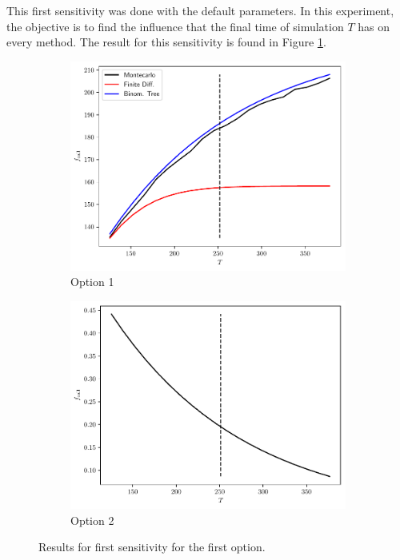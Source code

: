 \documentclass[11pt]{article}
\theoremstyle{definition}
\theoremstyle{remark}
\theoremstyle{remark}
\begin{document}
This first sensitivity was done with the default parameters. In this experiment,
the objective is to find the influence that the final time of simulation $T$ has
on every method. The result for this sensitivity is found in Figure
\ref{fig:fs1}.
\begin{figure}
  \centering
  \begin{subfigure}[b]{0.45\textwidth}
    \centering
    \includegraphics[scale=.5]{../plts/first_sens_opt1}
    \caption{Option 1}
  \end{subfigure}
  \begin{subfigure}[b]{0.45\textwidth}
    \centering
    \includegraphics[scale=.5]{../plts/first_sens_opt2}
    \caption{Option 2}
  \end{subfigure}
  \caption{Results for first sensitivity for the first option.}
  \label{fig:fs1}
\end{figure}
\end{document}
